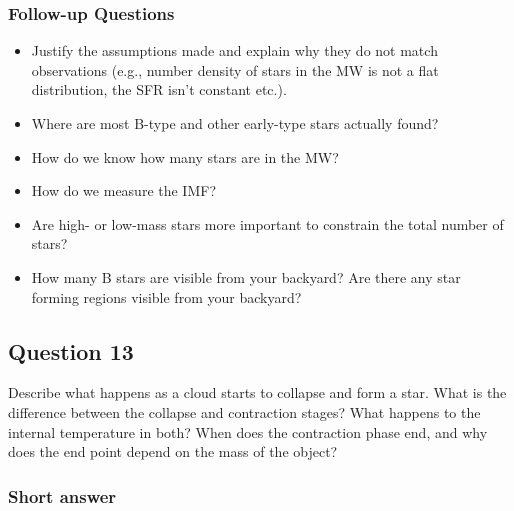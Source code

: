 \documentclass[a4paper,10pt]{article}
\begin{document}
\subsubsection{Follow-up Questions}

\begin{itemize}
    \item Justify the assumptions made and explain why they do not match observations (e.g., number density of stars in the MW is not a flat distribution, the SFR isn't constant etc.).
    \item Where are most B-type and other early-type stars actually found?
    \item How do we know how many stars are in the MW?
    \item How do we measure the IMF?
    \item Are high- or low-mass stars more important to constrain the total number of stars?
    \item How many B stars are visible from your backyard? Are there any star forming regions visible from your backyard?
\end{itemize}


\newpage
\subsection{Question 13}

Describe what happens as a cloud starts to collapse and form a star. What is the difference between the collapse and contraction stages? What happens to the internal temperature in both? When does the contraction phase end, and why does the end point depend on the mass of the object?

\subsubsection{Short answer}
\end{document}
